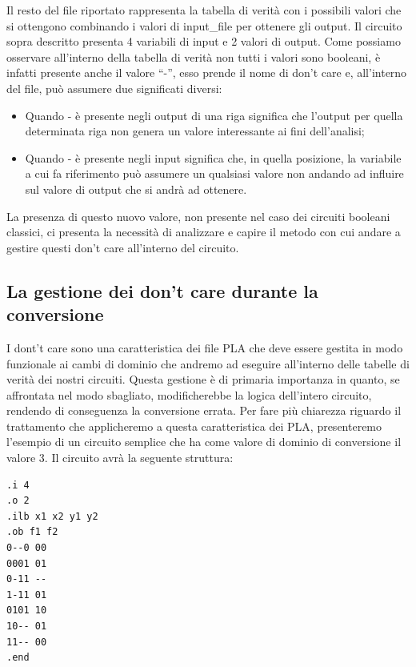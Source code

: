 \documentclass[
  italian,
]{book}
\providecommand{\tightlist}{%
  \setlength{\itemsep}{0pt}\setlength{\parskip}{0pt}}
\begin{document}
\newpage

Il resto del file riportato rappresenta la tabella di verità con i possibili valori che si ottengono combinando i valori di input\_file per ottenere gli output. Il circuito sopra descritto presenta 4 variabili di input e 2 valori di output. Come possiamo osservare all'interno della tabella di verità non tutti i valori sono booleani, è infatti presente anche il valore ``-'', esso prende il nome di don't care e, all'interno del file, può assumere due significati diversi:

\begin{itemize}
\tightlist
\item
  Quando - è presente negli output di una riga significa che l'output per quella determinata riga non genera un valore interessante ai fini dell'analisi;
\item
  Quando - è presente negli input significa che, in quella posizione, la variabile a cui fa riferimento può assumere un qualsiasi valore non andando ad influire sul valore di output che si andrà ad ottenere.
\end{itemize}

La presenza di questo nuovo valore, non presente nel caso dei circuiti booleani classici, ci presenta la necessità di analizzare e capire il metodo con cui andare a gestire questi don't care all'interno del circuito.

\hypertarget{la-gestione-dei-dont-care-durante-la-conversione}{%
\subsection{La gestione dei don't care durante la conversione}\label{la-gestione-dei-dont-care-durante-la-conversione}}

I dont't care sono una caratteristica dei file PLA che deve essere gestita in modo funzionale ai cambi di dominio che andremo ad eseguire all'interno delle tabelle di verità dei nostri circuiti. Questa gestione è di primaria importanza in quanto, se affrontata nel modo sbagliato, modificherebbe la logica dell'intero circuito, rendendo di conseguenza la conversione errata. Per fare più chiarezza riguardo il trattamento che applicheremo a questa caratteristica dei PLA, presenteremo l'esempio di un circuito semplice che ha come valore di dominio di conversione il valore 3. Il circuito avrà la seguente struttura:

\begin{verbatim}
.i 4
.o 2
.ilb x1 x2 y1 y2
.ob f1 f2
0--0 00    
0001 01
0-11 --
1-11 01
0101 10
10-- 01
11-- 00
.end
\end{verbatim}
\end{document}
